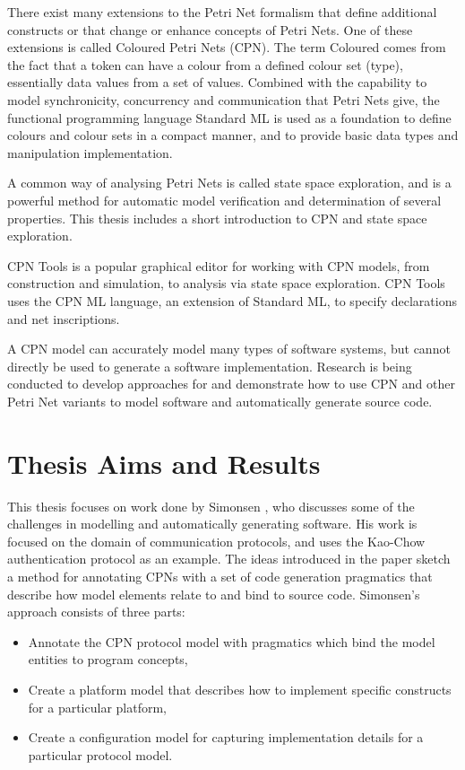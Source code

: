 There exist many extensions to the Petri Net formalism that define additional
constructs or that change or enhance concepts of Petri Nets. One of these
extensions is called Coloured Petri Nets (CPN). The term Coloured comes from
the fact that a token can have a colour from a defined colour set (type),
essentially data values from a set of values. Combined with the capability to
model synchronicity, concurrency and communication that Petri Nets give, the
functional programming language Standard ML \cite{milner1997definition} is used
as a foundation to define colours and colour sets in a compact manner, and to
provide basic data types and manipulation implementation.

A common way of analysing
Petri Nets is called state space exploration, and is a powerful method for
automatic model verification and determination of several properties. This
thesis includes a short introduction to CPN and state space exploration.


CPN Tools \cite{cpntools} is a popular graphical
editor for working with CPN models, from construction and simulation, to
analysis via state space exploration. CPN Tools uses the CPN ML language, an
extension of Standard ML, to specify declarations and net inscriptions.


	
A CPN model can accurately model many types of software systems, but cannot
directly be used to generate a software implementation. Research is being
conducted to develop approaches for and demonstrate how to use CPN and other
Petri Net variants to model software and automatically generate source code.


\section{Thesis Aims and Results}\label{sec:requirements}
This thesis focuses on work done by Simonsen \cite{Simonsen2011}, who discusses
some of the challenges in modelling and automatically generating software. His
work is focused on the domain of communication protocols, and uses the Kao-Chow
authentication protocol as an example.
The ideas introduced in the paper sketch a method for annotating CPNs with a
set of code generation pragmatics that describe how model elements relate to and
bind to source code. Simonsen's approach consists of three parts: 
\begin{itemize}
	\item Annotate the CPN protocol model with pragmatics which bind the model
	entities to program concepts,
	\item Create a platform	model that describes how to implement specific
	constructs for a particular platform,
	\item Create a configuration model for capturing implementation details for a
	particular protocol model.
\end{itemize}  

